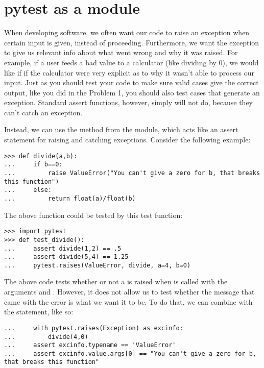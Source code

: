 \section*{pytest as a module}

When developing software, we often want our code to raise an exception when certain input is given, instead of proceeding.  Furthermore, we want the exception to give us relevant info about what went wrong and why it was raised.
For example, if a user feeds a bad value to a calculator (like dividing by 0), we would like if if the calculator were very explicit as to why it wasn't able to process our input.
Just as you should test your code to make sure valid cases give the correct output, like you did in the Problem 1, you should also test cases that generate an exception.  Standard assert functions, however, simply will not do, because they can't catch an exception.

Instead, we can use the  method from the  module, which acts like an assert statement for raising and catching exceptions.
Consider the following example:

\begin{lstlisting}
>>> def divide(a,b):
...     if b==0:
...         raise ValueError("You can't give a zero for b, that breaks this function")
...     else:
...         return float(a)/float(b)
\end{lstlisting}
The above function could be tested by this test function:
\begin{lstlisting}
>>> import pytest
>>> def test_divide():
...     assert divide(1,2) == .5
...     assert divide(5,4) == 1.25
...     pytest.raises(ValueError, divide, a=4, b=0)

\end{lstlisting}

The above code tests whether or not a  is raised when  is called with the arguments  and .  However, it does not allow us to test whether the message that came with the error is what we want it to be.  To do that, we can combine  with the  statement, like so:

\begin{lstlisting}
...     with pytest.raises(Exception) as excinfo:
...         divide(4,0)
...     assert excinfo.typename == 'ValueError'
...     assert excinfo.value.args[0] == "You can't give a zero for b, that breaks this function"
\end{lstlisting}

